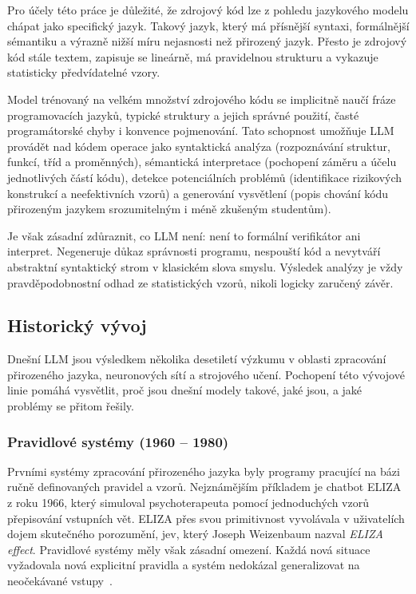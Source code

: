 Pro účely této práce je důležité, že zdrojový kód lze z pohledu jazykového modelu chápat jako specifický jazyk.
Takový jazyk, který má přísnější syntaxi, formálnější sémantiku a výrazně nižší míru nejasnosti než přirozený jazyk.
Přesto je zdrojový kód stále textem, zapisuje se lineárně, má pravidelnou strukturu a vykazuje statisticky předvídatelné vzory.

Model trénovaný na velkém množství zdrojového kódu se implicitně naučí fráze programovacích jazyků, typické struktury a jejich správné použití, časté programátorské chyby i konvence pojmenování.
Tato schopnost umožňuje LLM provádět nad kódem operace jako syntaktická analýza (rozpoznávání struktur, funkcí, tříd a proměnných), sémantická interpretace (pochopení záměru a účelu jednotlivých částí kódu), detekce potenciálních problémů (identifikace rizikových konstrukcí a neefektivních vzorů) a generování vysvětlení (popis chování kódu přirozeným jazykem srozumitelným i méně zkušeným studentům).

Je však zásadní zdůraznit, co LLM není: není to formální verifikátor ani interpret.
Negeneruje důkaz správnosti programu, nespouští kód a nevytváří abstraktní syntaktický strom v klasickém slova smyslu.
Výsledek analýzy je vždy pravděpodobnostní odhad ze statistických vzorů, nikoli logicky zaručený závěr.

\subsection{Historický vývoj}
\label{subsec:llm-history}

Dnešní LLM jsou výsledkem několika desetiletí výzkumu v oblasti zpracování přirozeného jazyka, neuronových sítí a strojového učení.
Pochopení této vývojové linie pomáhá vysvětlit, proč jsou dnešní modely takové, jaké jsou, a jaké problémy se přitom řešily.

\subsubsection*{Pravidlové systémy (1960 -- 1980)}
\label{subsubsec:llm-history-rules}

Prvními systémy zpracování přirozeného jazyka byly programy pracující na bázi ručně definovaných pravidel a vzorů.
Nejznámějším příkladem je chatbot ELIZA z roku 1966, který simuloval psychoterapeuta pomocí jednoduchých vzorů přepisování vstupních vět.
ELIZA přes svou primitivnost vyvolávala v uživatelích dojem skutečného porozumění, jev, který Joseph Weizenbaum nazval \textit{ELIZA effect}.
Pravidlové systémy měly však zásadní omezení.
Každá nová situace vyžadovala nová explicitní pravidla a systém nedokázal generalizovat na neočekávané vstupy~\cite{weizenbaum-eliza}.

